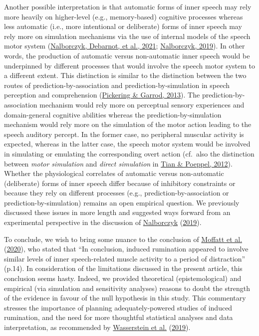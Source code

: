 \documentclass[
  english,
  man, donotrepeattitle,mask,floatsintext]{apa6}
\begin{document}
Another possible interpretation is that automatic forms of inner speech may rely more heavily on higher-level (e.g., memory-based) cognitive processes whereas less automatic (i.e., more intentional or deliberate) forms of inner speech may rely more on simulation mechanisms via the use of internal models of the speech motor system (\protect\hyperlink{ref-nalborczyk_role_2021}{Nalborczyk, Debarnot, et al., 2021}; \protect\hyperlink{ref-nalborczyk_understanding_2019}{Nalborczyk, 2019}). In other words, the production of automatic versus non-automatic inner speech would be underpinned by different processes that would involve the speech motor system to a different extent. This distinction is similar to the distinction between the two routes of prediction-by-association and prediction-by-simulation in speech perception and comprehension (\protect\hyperlink{ref-pickering_integrated_2013}{Pickering \& Garrod, 2013}). The prediction-by-association mechanism would rely more on perceptual sensory experiences and domain-general cognitive abilities whereas the prediction-by-simulation mechanism would rely more on the simulation of the motor action leading to the speech auditory percept. In the former case, no peripheral muscular activity is expected, whereas in the latter case, the speech motor system would be involved in simulating or emulating the corresponding overt action (cf.~also the distinction between \emph{motor simulation} and \emph{direct simulation} in \protect\hyperlink{ref-tian_mental_2012}{Tian \& Poeppel, 2012}). Whether the physiological correlates of automatic versus non-automatic (deliberate) forms of inner speech differ because of inhibitory constraints or because they rely on different processes (e.g., prediction-by-association or prediction-by-simulation) remains an open empirical question. We previously discussed these issues in more length and suggested ways forward from an experimental perspective in the discussion of \protect\hyperlink{ref-nalborczyk_understanding_2019}{Nalborczyk} (\protect\hyperlink{ref-nalborczyk_understanding_2019}{2019}).

To conclude, we wish to bring some nuance to the conclusion of \protect\hyperlink{ref-moffatt_inner_2020}{Moffatt et al.} (\protect\hyperlink{ref-moffatt_inner_2020}{2020}), who stated that ``In conclusion, induced rumination appeared to involve similar levels of inner speech-related muscle activity to a period of distraction'' (p.14). In consideration of the limitations discussed in the present article, this conclusion seems hasty. Indeed, we provided theoretical (epistemological) and empirical (via simulation and sensitivity analyses) reasons to doubt the strength of the evidence in favour of the null hypothesis in this study. This commentary stresses the importance of planning adequately-powered studies of induced rumination, and the need for more thoughtful statistical analyses and data interpretation, as recommended by \protect\hyperlink{ref-wasserstein_moving_2019}{Wasserstein et al.} (\protect\hyperlink{ref-wasserstein_moving_2019}{2019}).
\end{document}
